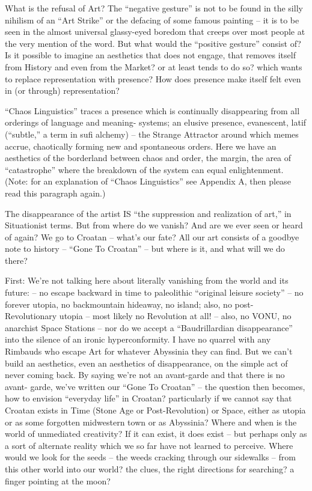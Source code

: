 \documentclass[a4paper,english,10pt,twoside]{article}
\begin{document}
\medskip
What is the refusal of Art? The \enquote{negative gesture} is not to be found in the silly nihilism of an \enquote{Art Strike} or the defacing of some famous painting -- it is to be seen in the almost universal glassy-eyed boredom that creeps over most people at the very mention of the word. But what would the \enquote{positive gesture} consist of? Is it possible to imagine an aesthetics that does not engage, that removes itself from History and even from the Market? or at least tends to do so? which wants to replace representation with presence? How does presence make itself felt even in (or through) representation?

\medskip
\enquote{Chaos Linguistics} traces a presence which is continually disappearing from all orderings of language and meaning- systems; an elusive presence, evanescent, latif (\enquote{subtle,} a term in sufi alchemy) -- the Strange Attractor around which memes accrue, chaotically forming new and spontaneous orders. Here we have an aesthetics of the borderland between chaos and order, the margin, the area of \enquote{catastrophe} where the breakdown of the system can equal enlightenment. (Note: for an explanation of \enquote{Chaos Linguistics} see Appendix A, then please read this paragraph again.)

\medskip
The disappearance of the artist IS \enquote{the suppression and realization of art,} in Situationist terms. But from where do we vanish? And are we ever seen or heard of again? We go to Croatan -- what's our fate? All our art consists of a goodbye note to history -- \enquote{Gone To Croatan} -- but where is it, and what will we do there?

\medskip
First: We're not talking here about literally vanishing from the world and its future: -- no escape backward in time to paleolithic \enquote{original leisure society} -- no forever utopia, no backmountain hideaway, no island; also, no post- Revolutionary utopia -- most likely no Revolution at all! --  also, no VONU, no anarchist Space Stations -- nor do we accept a \enquote{Baudrillardian disappearance} into the silence of an ironic hyperconformity. I have no quarrel with any Rimbauds who escape Art for whatever Abyssinia they can find. But we can't build an aesthetics, even an aesthetics of disappearance, on the simple act of never coming back. By saying we're not an avant-garde and that there is no avant- garde, we've written our \enquote{Gone To Croatan} -- the question then becomes, how to envision \enquote{everyday life} in Croatan? particularly if we cannot say that Croatan exists in Time (Stone Age or Post-Revolution) or Space, either as utopia or as some forgotten midwestern town or as Abyssinia? Where and when is the world of unmediated creativity? If it can exist, it does exist -- but perhaps only as a sort of alternate reality which we so far have not learned to perceive. Where would we look for the seeds -- the weeds cracking through our sidewalks -- from this other world into our world? the clues, the right directions for searching? a finger pointing at the moon?
\end{document}
